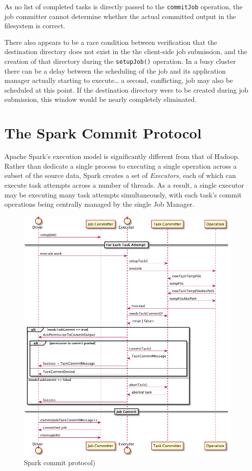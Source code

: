 \documentclass[conference]{IEEEtran}
\begin{document}
As no list of completed tasks is directly passed to the \texttt{commitJob} operation,
the job committer cannot determine whether the actual committed output
in the filesystem is correct.

There also appears to be a race condition between
verification that the destination directory does not exist in the
the client-side job submission, and the creation of that directory during
the \texttt{setupJob()} operation.
In a busy cluster there can be a delay between the scheduling of the job and
its application manager actually starting to execute\ldots
a second, conflicting, job may also be scheduled at this point.
If the destination directory were to be created during job submission,
this window would be nearly completely eliminated.


\section{The Spark Commit Protocol}
\label{sec:spark-commit-protocol}

Apache Spark's execution model is significantly different from
that of Hadoop.
Rather than dedicate a single process to executing a single operation
across a subset of the source data, Spark creates a set of \emph{Executors},
each of which can execute task attempts across a number of threads.
As a result, a single executor may be executing many task attempts
simultaneously, with each task's commit operations being centrally managed
by the single Job Manager.

\begin{figure}
  \centering
  \includegraphics[width=.8\textwidth]{spark-protocol.png}
  \caption{Spark commit protocol)}
  \label{fig:spark-protocol}
\end{figure}
\end{document}
